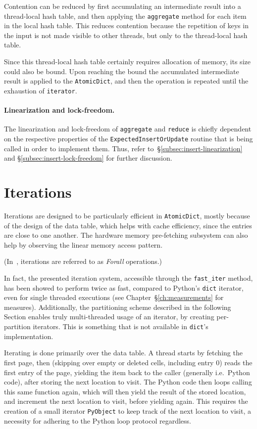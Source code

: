 Contention can be reduced by first accumulating an intermediate result into a thread-local hash table, and then applying the \texttt{aggregate} method for each item in the local hash table.
This reduces contention because the repetition of keys in the input is not made visible to other threads, but only to the thread-local hash table.

Since this thread-local hash table certainly requires allocation of memory, its size could also be bound.
Upon reaching the bound the accumulated intermediate result is applied to the \texttt{AtomicDict}, and then the operation is repeated until the exhaustion of \texttt{iterator}.


\paragraph{Linearization and lock-freedom.}
The linearization and lock-freedom of \texttt{aggregate} and \texttt{reduce} is chiefly dependent on the respective properties of the \texttt{ExpectedInsertOrUpdate} routine that is being called in order to implement them.
Thus, refer to~\S\ref{subsec:insert-linearization} and \S\ref{subsec:insert-lock-freedom} for further discussion.


\section{Iterations}\label{sec:iterations}

Iterations are designed to be particularly efficient in \texttt{AtomicDict}, mostly because of the design of the data table, which helps with cache efficiency, since the entries are close to one another.
The hardware memory pre-fetching subsystem can also help by observing the linear memory access pattern.

(In~\cite{maier}, iterations are referred to as \emph{Forall} operations.)

In fact, the presented iteration system, accessible through the \texttt{{fast\_iter}} method, has been showed to perform twice as fast, compared to Python's \texttt{dict} iterator, even for single threaded executions (see Chapter~\S\ref{ch:measurements} for measures).
Additionally, the partitioning scheme described in the following Section enables truly multi-threaded usage of an iterator, by creating per-partition iterators.
This is something that is not available in \texttt{dict}'s implementation.

Iterating is done primarily over the data table.
A thread starts by fetching the first page, then (skipping over empty or deleted cells, including entry 0) reads the first entry of the page, yielding the item back to the caller (generally i.e.\ Python code), after storing the next location to visit.
The Python code then loops calling this same function again, which will then yield the result of the stored location, and increment the next location to visit, before yielding again.
This requires the creation of a small iterator \texttt{PyObject} to keep track of the next location to visit, a necessity for adhering to the Python loop protocol regardless.


